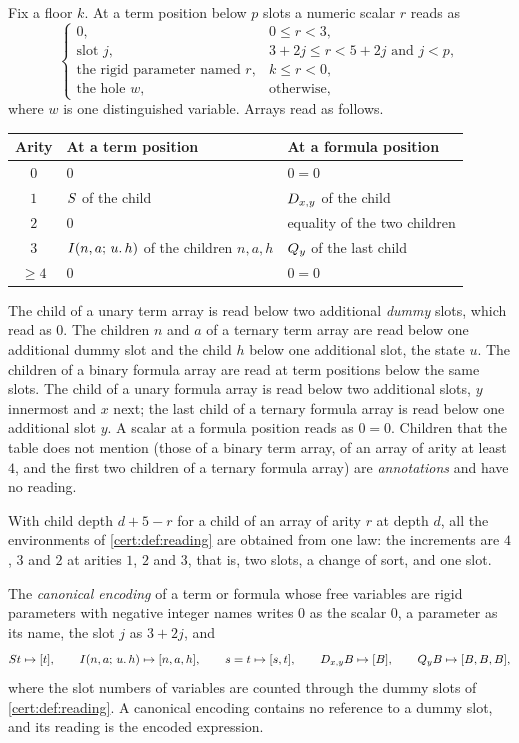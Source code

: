 \begin{definition}\label{cert:def:reading}
Fix a floor $k$. At a term position below $p$ slots a numeric scalar $r$ reads
as
\[
\begin{cases}
0, & 0\le r<3,\\
\text{slot } j, & 3+2j\le r<5+2j\text{ and } j<p,\\
\text{the rigid parameter named } r, & k\le r<0,\\
\text{the hole } w, & \text{otherwise},
\end{cases}
\]
where $w$ is one distinguished variable. Arrays read as follows.
\begin{center}
\begin{tabular}{@{}cll@{}}
\toprule
Arity & At a term position & At a formula position\\
\midrule
$0$ & $0$ & $0=0$\\
$1$ & $S$ of the child & $D_{x,y}$ of the child\\
$2$ & $0$ & equality of the two children\\
$3$ & $I(n,a;\,u.\,h)$ of the children $n,a,h$ & $Q_{y}$ of the last child\\
$\ge 4$ & $0$ & $0=0$\\
\bottomrule
\end{tabular}
\end{center}
The child of a unary term array is read below two additional \emph{dummy}
slots, which read as $0$. The children $n$ and $a$ of a ternary term array are
read below one additional dummy slot and the child $h$ below one additional
slot, the state $u$. The children of a binary formula array are read at term
positions below the same slots. The child of a unary formula array is read
below two additional slots, $y$ innermost and $x$ next; the last child of a
ternary formula array is read below one additional slot $y$. A scalar at a
formula position reads as $0=0$. Children that the table does not mention
(those of a binary term array, of an array of arity at least $4$, and the
first two children of a ternary formula array) are \emph{annotations} and
have no reading.
\end{definition}

With child depth $d+5-r$ for a child of an array of arity $r$ at depth $d$,
all the environments of \cref{cert:def:reading} are obtained from one law:
the increments are $4$, $3$ and $2$ at arities $1$, $2$ and $3$, that is, two
slots, a change of sort, and one slot.

\begin{definition}\label{cert:def:enc}
The \emph{canonical encoding} of a term or formula whose free variables are
rigid parameters with negative integer names writes $0$ as the scalar $0$, a
parameter as its name, the slot $j$ as $3+2j$, and
\[
S t\mapsto[t],\qquad I(n,a;\,u.\,h)\mapsto[n,a,h],\qquad
s=t\mapsto[s,t],\qquad D_{x,y}B\mapsto[B],\qquad Q_{y}B\mapsto[B,B,B],
\]
where the slot numbers of variables are counted through the dummy slots of
\cref{cert:def:reading}. A canonical encoding contains no reference to a
dummy slot, and its reading is the encoded expression.
\end{definition}

